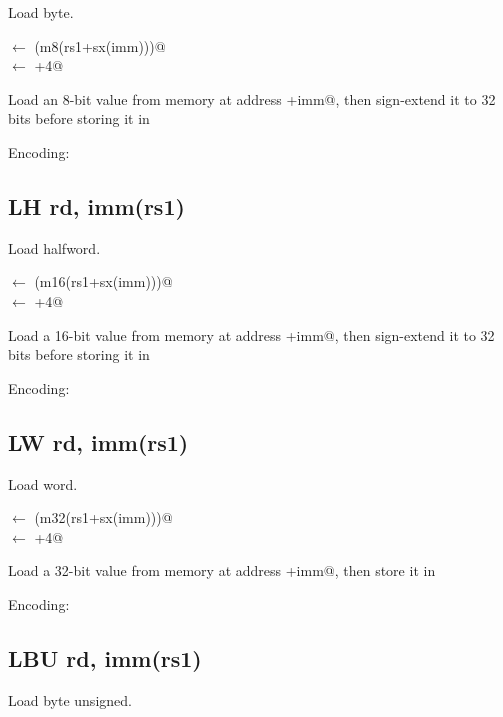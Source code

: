 Load byte.

\verb@rd@ $\leftarrow$ \verb@sx(m8(rs1+sx(imm)))@\\
\verb@pc@ $\leftarrow$ \verb@pc+4@

Load an 8-bit value from memory at address +imm@, then 
sign-extend it to 32 bits before storing it in \verb@rd@


Encoding:


\subsection{LH rd, imm(rs1)}

Load halfword.

\verb@rd@ $\leftarrow$ \verb@sx(m16(rs1+sx(imm)))@\\
\verb@pc@ $\leftarrow$ \verb@pc+4@

Load a 16-bit value from memory at address +imm@, then 
sign-extend it to 32 bits before storing it in \verb@rd@


Encoding:


\subsection{LW rd, imm(rs1)}

Load word.

\verb@rd@ $\leftarrow$ \verb@sx(m32(rs1+sx(imm)))@\\
\verb@pc@ $\leftarrow$ \verb@pc+4@

Load a 32-bit value from memory at address +imm@, then 
store it in \verb@rd@

Encoding:



\subsection{LBU rd, imm(rs1)}

Load byte unsigned.

